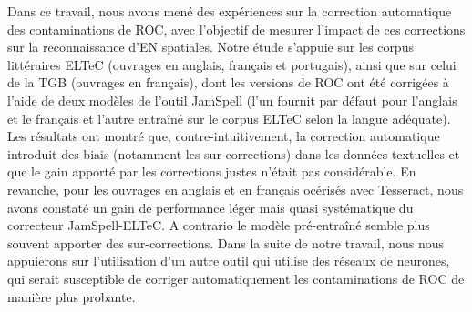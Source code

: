 Dans ce travail, nous avons mené des expériences sur la correction automatique des contaminations de ROC, avec l'objectif de mesurer l'impact de ces corrections sur la reconnaissance d'EN spatiales. Notre étude s'appuie sur les corpus littéraires ELTeC (ouvrages en anglais, français et portugais), ainsi que sur celui de la TGB (ouvrages en français), dont les versions de ROC ont été corrigées à l'aide de deux modèles de l'outil JamSpell (l'un fournit par défaut pour l'anglais et le français et l'autre entraîné sur le corpus ELTeC selon la langue adéquate). Les résultats ont montré que, contre-intuitivement, la correction automatique introduit des biais (notamment les sur-corrections) dans les données textuelles et que le gain apporté par les corrections justes n'était pas considérable. En revanche, pour les ouvrages en anglais et en français océrisés avec Tesseract, nous avons constaté un gain de performance léger mais quasi systématique du correcteur JamSpell-ELTeC. A contrario le modèle pré-entraîné semble plus souvent apporter des sur-corrections. Dans la suite de notre travail, nous nous appuierons sur l'utilisation d'un autre outil qui utilise des réseaux de neurones, qui serait susceptible de corriger automatiquement les contaminations de ROC de manière plus probante.